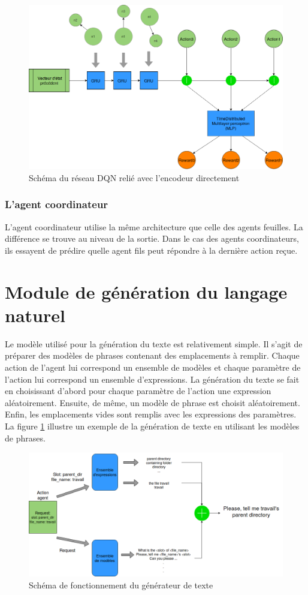 \begin{figure}[H] 
	\centering
	\includegraphics[width=0.88\linewidth]{images/Conception/DM/encoder_dqn.png}
	\caption{Schéma du réseau DQN relié avec l'encodeur directement}
\end{figure}\label{encoder_dqn}
\subsubsection*{L'agent coordinateur}
L'agent coordinateur utilise la même architecture que celle des agents feuilles. La différence se trouve au niveau de la sortie. Dans le cas des agents coordinateurs, ils essayent de prédire quelle agent fils peut répondre à la dernière action reçue.
\section{Module de génération du langage naturel}
Le modèle utilisé pour la génération du texte est relativement simple. Il s'agit de préparer des modèles de phrases contenant des emplacements à remplir. Chaque action de l'agent lui correspond un ensemble de modèles et chaque paramètre de l'action lui correspond un ensemble d'expressions. La génération du texte se fait en choisissant d'abord pour chaque paramètre de l'action une expression aléatoirement. Ensuite, de même, un modèle de phrase est choisit aléatoirement. Enfin, les emplacements vides sont remplis avec les expressions des paramètres. La figure \ref{nlg_schema} illustre un exemple de la génération de texte en utilisant les modèles de phrases.
\begin{figure}[H] 
	\centering
	\includegraphics[width=0.95\linewidth]{images/Conception/NLG.png}
	\caption{Schéma de fonctionnement du générateur de texte}\label{nlg_schema}
\end{figure}
